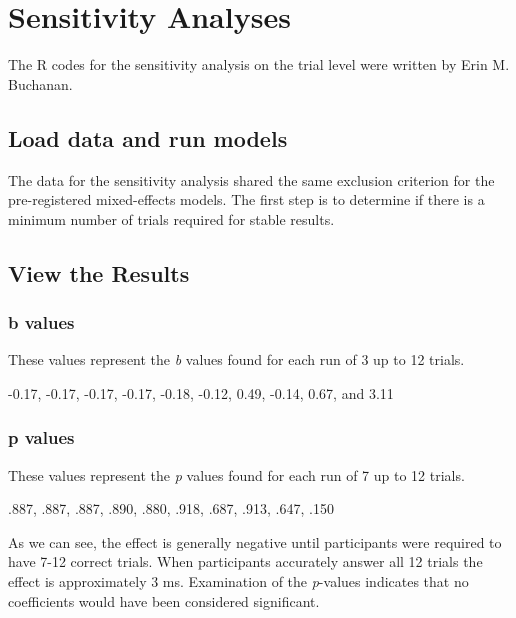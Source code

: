 \documentclass[
  man,floatsintext]{apa7}
\begin{document}
\newpage

\hypertarget{appendix-appendix}{%
\appendix}


\hypertarget{sensitivity-analyses}{%
\section{Sensitivity Analyses}\label{sensitivity-analyses}}

The R codes for the sensitivity analysis on the trial level were written by Erin M. Buchanan.

\hypertarget{load-data-and-run-models}{%
\subsection{Load data and run models}\label{load-data-and-run-models}}

The data for the sensitivity analysis shared the same exclusion criterion for the pre-registered mixed-effects models. The first step is to determine if there is a minimum number of trials required for stable results.

\hypertarget{view-the-results}{%
\subsection{View the Results}\label{view-the-results}}

\hypertarget{b-values}{%
\subsubsection{b values}\label{b-values}}

These values represent the \emph{b} values found for each run of 3 up to 12 trials.

-0.17, -0.17, -0.17, -0.17, -0.18, -0.12, 0.49, -0.14, 0.67, and 3.11

\hypertarget{p-values}{%
\subsubsection{p values}\label{p-values}}

These values represent the \emph{p} values found for each run of 7 up to 12 trials.

.887, .887, .887, .890, .880, .918, .687, .913, .647, .150

As we can see, the effect is generally negative until participants were required to have 7-12 correct trials. When participants accurately answer all 12 trials the effect is approximately 3 ms. Examination of the \emph{p}-values indicates that no coefficients would have been considered significant.
\end{document}
